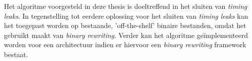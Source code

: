 \documentclass[master=cws,masteroption=ai, english]{kulemt}
\begin{document}
\begin{abstract*}
Het algoritme voorgesteld in deze thesis is doeltreffend in het sluiten van \textit{timing leaks}. 
In tegenstelling tot eerdere oplossing voor het sluiten van \textit{timing leaks} kan het toegepast worden op bestaande, 'off-the-shelf' binaire bestanden, omdat het gebruikt maakt van \textit{binary rewriting}.  
Verder kan het algoritme ge\"implementeerd worden voor een architectuur indien er hiervoor een \textit{binary rewriting} framework bestaat. 
\end{abstract*}


\listoffiguresandtables


\mainmatter 









\backmatter 



\end{document}
